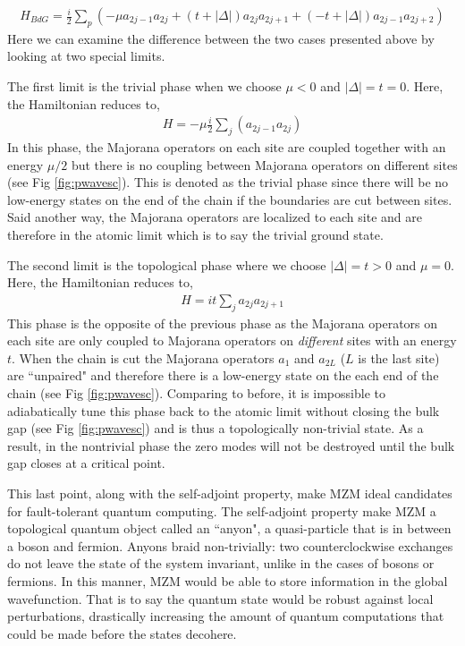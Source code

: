 \begin{align}
	H_{BdG} = \frac{i}{2}\sum_{p}\left(-\mu a_{2j-1}a_{2j}+(t+|\Delta|)a_{2j}a_{2j+1}+(-t+|\Delta|)a_{2j-1}a_{2j+2}\right)
\end{align}
Here we can examine the difference between the two cases presented above by looking at two special limits.\par 
The first limit is the trivial phase when we choose $\mu < 0$ and $|\Delta|=t=0$. Here, the Hamiltonian reduces to,
\begin{align}
	H = -\mu\frac{i}{2}\sum_{j}(a_{2j-1}a_{2j})
\end{align}
In this phase, the Majorana operators on each site are coupled together with an energy $\mu/2$ but there is no coupling between Majorana operators on different sites (see Fig \ref{fig:pwavesc}). This is denoted as the trivial phase since there will be no low-energy states on the end of the chain if the boundaries are cut between sites. Said another way, the Majorana operators are localized to each site and are therefore in the atomic limit which is to say the trivial ground state.\par 
The second limit is the topological phase where we choose $|\Delta|=t>0$ and $\mu=0$. Here, the Hamiltonian reduces to,
\begin{align}
	H=it\sum_{j}a_{2j}a_{2j+1}
\end{align}
This phase is the opposite of the previous phase as the Majorana operators on each site are only coupled to Majorana operators on \textit{different} sites with an energy $t$. When the chain is cut the Majorana operators $a_{1}$ and $a_{2L}$ ($L$ is the last site) are ``unpaired" and therefore there is a low-energy state on the each end of the chain (see Fig \ref{fig:pwavesc}). Comparing to before, it is impossible to adiabatically tune this phase back to the atomic limit without closing the bulk gap (see Fig \ref{fig:pwavesc}) and is thus a topologically non-trivial state. As a result, in the nontrivial phase the zero modes will not be destroyed until the bulk gap closes at a critical point.\par 
This last point, along with the self-adjoint property, make \ac{MZM} ideal candidates for fault-tolerant quantum computing. The self-adjoint property make \ac{MZM} a topological quantum object called an ``anyon", a quasi-particle that is in between a boson and fermion. Anyons braid non-trivially: two counterclockwise exchanges do not leave the state of the system invariant, unlike in the cases of bosons or fermions\cite{Sarma2015, Knapp2019}. In this manner, \ac{MZM} would be able to store information in the global wavefunction. That is to say the quantum state would be robust against local perturbations, drastically increasing the amount of quantum computations that could be made before the states decohere.\par 
